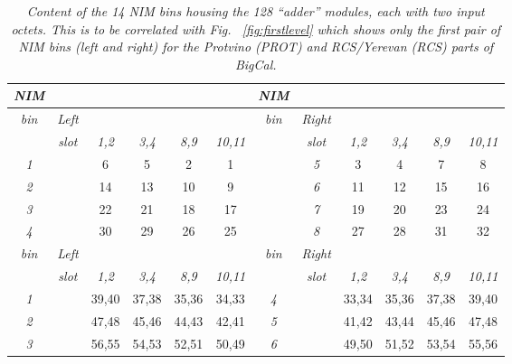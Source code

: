 \documentclass{chowto}
\begin{document}
\small{
\begin{table}[h]
\caption[]{\it Content of the 14 NIM bins housing the 128 ``adder'' modules, 
each with two input octets. This is to be correlated with Fig.~ 
\ref{fig:firstlevel} which shows
only the first pair of NIM bins (left and right) for the Protvino (PROT) and 
RCS/Yerevan (RCS) parts of BigCal.}
\begin{center}
\begin{tabular}{|c|c|c|c|c|c|c|c|c|c|c|c|}
\hline
\it NIM & & & & & & \it NIM & & & & &  \\ \hline
\it bin&\it Left  & & & & & \it bin & \it Right & & & & \\ \hline
 & \it slot & \it 1,2 &\it 3,4 &\it 8,9 & \it 10,11 & & \it slot&\it 1,2 &\it 3,4 &
\it 8,9 &\it 10,11 \\ \hline
\it 1& &6 & 5 & 2 & 1 & & \it 5 & 3 & 4 & 7 & 8 \\

\it 2 & &14 & 13 & 10 & 9 & & \it 6 & 11 & 12 & 15 & 16 \\

\it 3 & &22 & 21 & 18 & 17 & & \it 7 & 19 & 20 & 23 & 24 \\

\it 4 & &30 & 29 & 26 & 25 & & \it 8 & 27 & 28 & 31 & 32 \\ \hline

\it bin & \it Left & & & & & \it bin & \it Right & & & & \\ \hline

 & \it slot & \it 1,2 &\it 3,4 &\it 8,9 & \it 10,11 & & \it slot&\it 1,2 &\it 3,4 &
\it 8,9 &\it 10,11 \\ \hline

\it 1 & & 39,40 & 37,38 & 35,36 &34,33 &\it 4 & & 33,34 & 35,36 & 37,38 & 39,40 \\       

\it 2 & & 47,48 & 45,46 & 44,43 & 42,41 &\it 5 & & 41,42 & 43,44 & 45,46 & 47,48 \\ 

\it 3 & & 56,55 & 54,53 & 52,51 & 50,49 &\it 6 & & 49,50 & 51,52 & 53,54 & 55,56 \\
\hline \hline
\end{tabular}
\end{center}
\label{tab:firstdetail}
\end{table}
}
\end{document}
